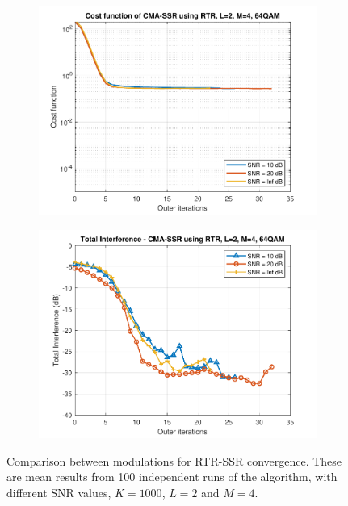 \begin{figure}
\begin{subfigure}[b]{0.45\textwidth}
		\includegraphics[width=\linewidth]{./figs/BF_RTR_cost_64QAM_L=2_M=4_K=1000.pdf}
		\label{fig:rtr_cost64}
	\end{subfigure}
	\begin{subfigure}[b]{0.45\textwidth}
		\includegraphics[width=\linewidth]{./figs/BF_RTR_TI_64QAM_L=2_M=4_K=1000.pdf}
		\label{fig:rtr_ti64}
	\end{subfigure}
	\caption{Comparison between modulations for RTR-SSR convergence. These are mean results from 100 independent runs of the algorithm, with different SNR values, $K=1000$, $L=2$ and $M=4$.}
	\label{fig:CMA_RTR_mods_L2M4}
\end{figure}

